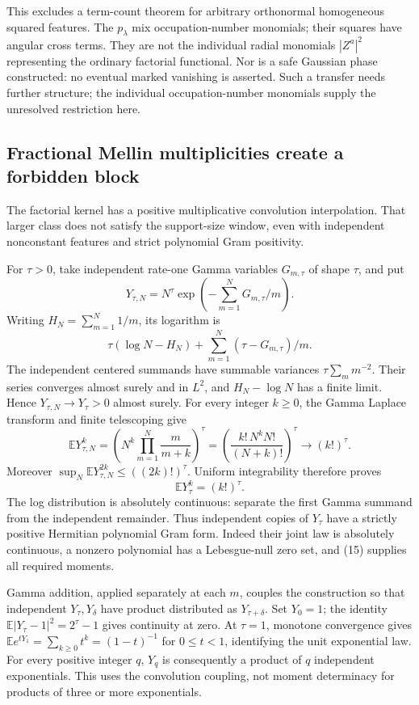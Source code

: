 \documentclass[11pt]{article}
\begin{document}
This excludes a term-count theorem for arbitrary orthonormal homogeneous
squared features. The $p_\lambda$ mix occupation-number monomials;
their squares have angular cross terms. They are not the individual
radial monomials $|Z^a|^2$ representing the ordinary factorial functional.
Nor is a safe Gaussian phase constructed: no eventual marked vanishing
is asserted. Such a transfer needs further structure; the individual occupation-number
monomials supply the unresolved restriction here.

\subsection{Fractional Mellin multiplicities create a forbidden block}
The factorial kernel has a positive multiplicative convolution
interpolation. That larger class does not satisfy the support-size window,
even with independent nonconstant features and strict polynomial Gram
positivity.

For $\tau>0$, take independent rate-one Gamma variables
$G_{m,\tau}$ of shape $\tau$, and put
\[
 Y_{\tau,N}=N^\tau\exp\left(-\sum_{m=1}^N G_{m,\tau}/m\right).
\]
Writing $H_N=\sum_{m=1}^N1/m$, its logarithm is
\[
 \tau(\log N-H_N)+\sum_{m=1}^N(\tau-G_{m,\tau})/m.
\]
The independent centered summands have summable variances
$\tau\sum_m m^{-2}$. Their series converges almost surely and in
$L^2$, and $H_N-\log N$ has a finite limit. Hence
$Y_{\tau,N}\longrightarrow Y_\tau>0$ almost surely.
For every integer $k\ge0$, the Gamma Laplace transform and finite
telescoping give
\[
 \mathbb E Y_{\tau,N}^k
 =\left(N^k\prod_{m=1}^N\frac{m}{m+k}\right)^\tau
 =\left(\frac{k!\,N^kN!}{(N+k)!}\right)^\tau
 \longrightarrow (k!)^\tau .
\]
Moreover $\sup_N\mathbb E Y_{\tau,N}^{2k}\le((2k)!)^\tau$.
Uniform integrability therefore proves
\[
                    \mathbb E Y_\tau^k=(k!)^\tau.       \tag{15}
\]
The log distribution is absolutely continuous: separate the first
Gamma summand from the independent remainder. Thus independent copies
of $Y_\tau$ have a strictly positive Hermitian polynomial Gram form.
Indeed their joint law is absolutely continuous, a nonzero polynomial
has a Lebesgue-null zero set, and (15) supplies all required moments.

Gamma addition, applied separately at each $m$, couples the construction
so that independent $Y_\tau,Y_\delta$ have product distributed as
$Y_{\tau+\delta}$. Set $Y_0=1$; the identity
$\mathbb E|Y_\tau-1|^2=2^\tau-1$ gives continuity at zero.
At $\tau=1$, monotone convergence gives
$\mathbb E e^{tY_1}=\sum_{k\ge0}t^k=(1-t)^{-1}$ for $0\le t<1$,
identifying the unit exponential law. For every positive integer $q$,
$Y_q$ is consequently a product of $q$ independent exponentials.
This uses the convolution coupling, not moment determinacy for
products of three or more exponentials.
\end{document}
